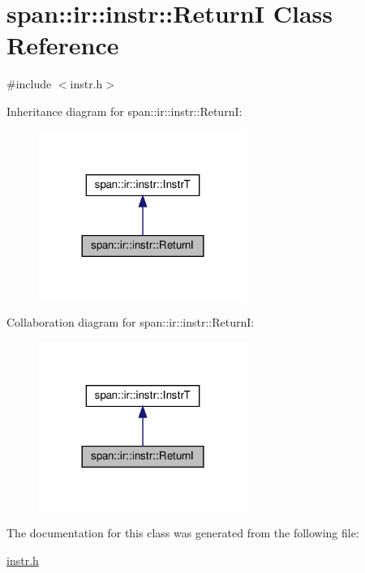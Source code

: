 \hypertarget{classspan_1_1ir_1_1instr_1_1ReturnI}{}\section{span\+:\+:ir\+:\+:instr\+:\+:ReturnI Class Reference}
\label{classspan_1_1ir_1_1instr_1_1ReturnI}


{\ttfamily \#include $<$instr.\+h$>$}



Inheritance diagram for span\+:\+:ir\+:\+:instr\+:\+:ReturnI\+:\nopagebreak
\begin{figure}[H]
\begin{center}
\leavevmode
\includegraphics[width=192pt]{classspan_1_1ir_1_1instr_1_1ReturnI__inherit__graph}
\end{center}
\end{figure}


Collaboration diagram for span\+:\+:ir\+:\+:instr\+:\+:ReturnI\+:\nopagebreak
\begin{figure}[H]
\begin{center}
\leavevmode
\includegraphics[width=192pt]{classspan_1_1ir_1_1instr_1_1ReturnI__coll__graph}
\end{center}
\end{figure}


The documentation for this class was generated from the following file\+:\begin{DoxyCompactItemize}
\item 
\hyperlink{instr_8h}{instr.\+h}\end{DoxyCompactItemize}
